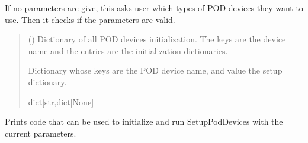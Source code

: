 \documentclass[letterpaper,10pt,english]{sphinxmanual}
\begin{document}
\begin{fulllineitems}
\begin{fulllineitems}
\label{\detokenize{Setup.SetupAllDevices:Setup.SetupAllDevices.Setup_PodDevices.SetupAll._GetParams}}
\pysigstartsignatures
{}
\pysigstopsignatures
\sphinxAtStartPar
If no parameters are give, this asks user which types of POD devices they want to use.         Then it checks if the parameters are valid.
\begin{quote}\begin{description}
\sphinxAtStartPar
{} (\sphinxstyleliteralemphasis{\sphinxupquote{ | }}\sphinxstyleliteralemphasis{\sphinxupquote{{[}}}\sphinxstyleliteralemphasis{\sphinxupquote{,}}\sphinxstyleliteralemphasis{\sphinxupquote{{]}}}) \textendash{} Dictionary of all POD devices initialization.                 The keys are the device name and the entries are the initialization dictionaries.

\sphinxAtStartPar
Dictionary whose keys are the POD device name, and value the setup                 dictionary.

\sphinxAtStartPar
dict{[}str,dict|None{]}

\end{description}\end{quote}

\end{fulllineitems}


\begin{fulllineitems}
\label{\detokenize{Setup.SetupAllDevices:Setup.SetupAllDevices.Setup_PodDevices.SetupAll._PrintInitCode}}
\pysigstartsignatures
{}
\pysigstopsignatures
\sphinxAtStartPar
Prints code that can be used to initialize and run SetupPodDevices with the         current parameters.


\end{fulllineitems}
\end{fulllineitems}
\end{document}
